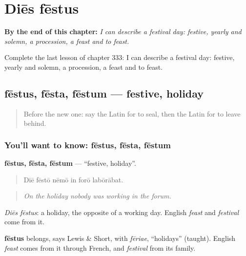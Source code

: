 
\chapter{Diēs fēstus}
\label{ch:la-dies-festus}

\begin{chapteropening}
\textbf{By the end of this chapter:} \emph{I can describe a festival day: festive, yearly and solemn, a procession, a feast and to feast.}

Complete the last lesson of chapter 333: I can describe a festival day: festive, yearly and solemn, a procession, a feast and to feast.
\end{chapteropening}

\section[fēstus, fēsta, fēstum]{fēstus, fēsta, fēstum — festive, holiday}

\label{lesson:LA-C333-festus}



\begin{quote}
Before the new one: say the Latin for to seal, then the Latin for to leave behind.
\end{quote}

\subsection*{You'll want to know: fēstus, fēsta, fēstum}
\textbf{fēstus, fēsta, fēstum} — \textquotedblleft{}festive, holiday\textquotedblright{}.

\begin{quote}
Diē fēstō nēmō in forō labōrābat.
\end{quote}

\begin{quote}
\emph{On the holiday nobody was working in the forum.}
\end{quote}

\emph{Diēs fēstus}: a holiday, the opposite of a working day. English \emph{feast} and \emph{festival} come from it.

\begin{cousinweb}
\textbf{fēstus} belongs, says Lewis \& Short, with \emph{fēriae}, \textquotedblleft{}holidays\textquotedblright{} (taught). English \emph{feast} comes from it through French, and \emph{festival} from its family.
\end{cousinweb}

